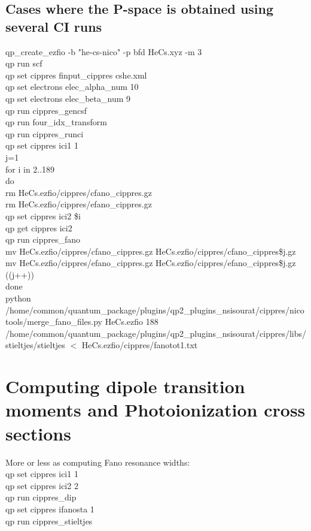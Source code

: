 \documentclass[a4paper, 10 pt]{report}
\begin{document}
\subsection{Cases where the P-space is obtained using several CI runs}

\noindent qp\_create\_ezfio -b "he-cs-nico" -p bfd HeCs.xyz -m 3\\
qp run scf\\
qp set cippres finput\_cippres cshe.xml\\
qp set electrons elec\_alpha\_num 10\\
qp set electrons elec\_beta\_num 9\\
qp run cippres\_gencsf\\
qp run four\_idx\_transform\\
qp run cippres\_runci\\
qp set cippres ici1 1\\
j=1\\
for i in {2..189}\\
do\\
rm HeCs.ezfio/cippres/cfano\_cippres.gz\\
rm HeCs.ezfio/cippres/efano\_cippres.gz\\
qp set cippres ici2 \$i\\
qp get cippres ici2\\
qp run cippres\_fano\\
mv HeCs.ezfio/cippres/cfano\_cippres.gz HeCs.ezfio/cippres/cfano\_cippres\${j}.gz\\
mv HeCs.ezfio/cippres/efano\_cippres.gz HeCs.ezfio/cippres/efano\_cippres\${j}.gz\\
((j++))\\
done\\
python /home/common/quantum\_package/plugins/qp2\_plugins\_nsisourat/cippres/nicotools/merge\_fano\_files.py HeCs.ezfio 188\\
/home/common/quantum\_package/plugins/qp2\_plugins\_nsisourat/cippres/libs/stieltjes/stieltjes $<$ HeCs.ezfio/cippres/fanotot1.txt\\

\section{Computing dipole transition moments and Photoionization cross sections}

\noindent More or less as computing Fano resonance widths:\\
qp set cippres ici1 1 \\
qp set cippres ici2 2 \\
qp run cippres\_dip \\
qp set cippres ifanosta 1  \\
qp run cippres\_stieltjes  \\
\end{document}
